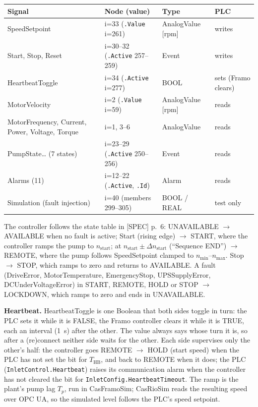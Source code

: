 \documentclass[11pt]{article}
\begin{document}
{\small
\begin{tabularx}{\textwidth}{@{}L l l l@{}}
\toprule
Signal & Node (value) & Type & PLC \\
\midrule
SpeedSetpoint & i=33 (\texttt{.Value} i=261) & AnalogValue [rpm] & writes \\
Start, Stop, Reset & i=30--32 (\texttt{.Active} 257--259) & Event & writes \\
HeartbeatToggle & i=34 (\texttt{.Active} i=277) & BOOL & sets (Framo clears) \\
MotorVelocity & i=2 (\texttt{.Value} i=59) & AnalogValue [rpm] & reads \\
MotorFrequency, Current, Power, Voltage, Torque & i=1, 3--6 & AnalogValue & reads \\
PumpState\ldots{} (7 states) & i=23--29 (\texttt{.Active} 250--256) & Event & reads \\
Alarms (11) & i=12--22 (\texttt{.Active}, \texttt{.Id}) & Alarm & reads \\
Simulation (fault injection) & i=40 (members 299--305) & BOOL / REAL & test only \\
\bottomrule
\end{tabularx}}

The controller follows the state table in [SPEC] p.~6: UNAVAILABLE $\to$ AVAILABLE when no fault
is active; Start (rising edge) $\to$ START, where the controller ramps the pump to
$n_\text{start}$; at $n_\text{start}\pm\Delta n_\text{start}$ (``Sequence END'') $\to$ REMOTE, where
the pump follows SpeedSetpoint clamped to $n_\text{min}$--$n_\text{max}$. Stop $\to$ STOP, which
ramps to zero and returns to AVAILABLE. A fault (DriveError, MotorTemperature, EmergencyStop,
UPSSupplyError, DCUnderVoltageError) in START, REMOTE, HOLD or STOP $\to$ LOCKDOWN, which ramps to
zero and ends in UNAVAILABLE.

\textbf{Heartbeat.} HeartbeatToggle is one Boolean that both sides toggle in turn: the PLC sets it
while it is FALSE, the Framo controller clears it while it is TRUE, each an interval
(\SI{1}{s}) after the other. The value always says whose turn it is, so after a (re)connect
neither side waits for the other. Each side supervises only the other's half: the controller goes
REMOTE $\to$ HOLD (start speed) when the PLC has not set the bit for $T_\text{HB}$, and back to
REMOTE when it does; the PLC (\texttt{InletControl.Heartbeat}) raises its communication alarm when
the controller has not cleared the bit for \texttt{InletConfig.HeartbeatTimeout}. The ramp is the plant's
pump lag $T_p$, run in CasFramoSim; CasRioSim reads the resulting speed over OPC UA, so the
simulated level follows the PLC's speed setpoint.
\end{document}
